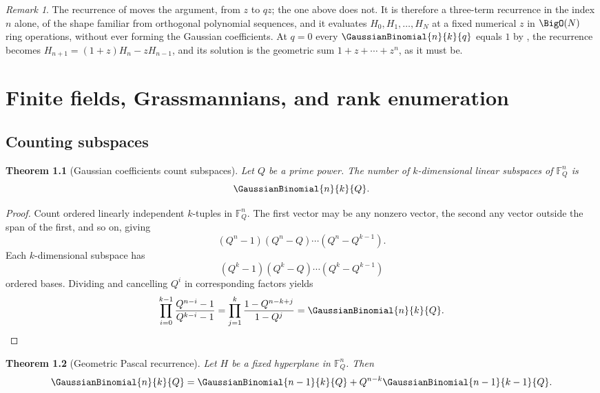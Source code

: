 \documentclass[11pt,a4paper,oneside,openany]{book}
\newtheorem{theorem}{Theorem}[chapter]
\theoremstyle{definition}
\theoremstyle{remark}
\newtheorem{remark}[remark]{Remark}
\newcommand{\F}{\mathbb F}
\begin{document}
\begin{remark}\label{rem:rogers-szego-three-term}
The recurrence of  moves the argument, from
$z$ to $qz$; the one above does not.  It is therefore a three-term recurrence
in the index $n$ alone, of the shape familiar from orthogonal polynomial
sequences, and it evaluates $H_0,H_1,\ldots,H_N$ at a fixed numerical $z$ in
$\BigO(N)$ ring operations, without ever forming the Gaussian coefficients.  At
$q=0$ every $\GaussianBinomial{n}{k}{q}$ equals $1$ by ,
the recurrence becomes $H_{n+1}=(1+z)H_n-zH_{n-1}$, and its solution is the
geometric sum $1+z+\cdots+z^{n}$, as it must be.
\end{remark}

\chapter{Finite fields, Grassmannians, and rank enumeration}\label{chap:finite-geometry}

\section{Counting subspaces}

\begin{theorem}[Gaussian coefficients count subspaces]\label{thm:subspace-count}
Let $Q$ be a prime power.  The number of $k$-dimensional linear subspaces of $\F_Q^n$ is
\[
 \GaussianBinomial{n}{k}{Q}.
\]
\end{theorem}

\begin{proof}
Count ordered linearly independent $k$-tuples in $\F_Q^n$.  The first vector may be any nonzero vector, the second any vector outside the span of the first, and so on, giving
\[
 (Q^n-1)(Q^n-Q)\cdots(Q^n-Q^{k-1}).
\]
Each $k$-dimensional subspace has
\[
 (Q^k-1)(Q^k-Q)\cdots(Q^k-Q^{k-1})
\]
ordered bases.  Dividing and cancelling $Q^i$ in corresponding factors yields
\[
 \prod_{i=0}^{k-1}\frac{Q^{n-i}-1}{Q^{k-i}-1}
 =\prod_{j=1}^{k}\frac{1-Q^{n-k+j}}{1-Q^j}
 =\GaussianBinomial{n}{k}{Q}.
\]
\end{proof}

\begin{theorem}[Geometric Pascal recurrence]\label{thm:geometric-pascal}
Let $H$ be a fixed hyperplane in $\F_Q^n$.  Then
\[
 \GaussianBinomial{n}{k}{Q}
 =\GaussianBinomial{n-1}{k}{Q}+Q^{n-k}\GaussianBinomial{n-1}{k-1}{Q}.
\]
\end{theorem}
\end{document}
